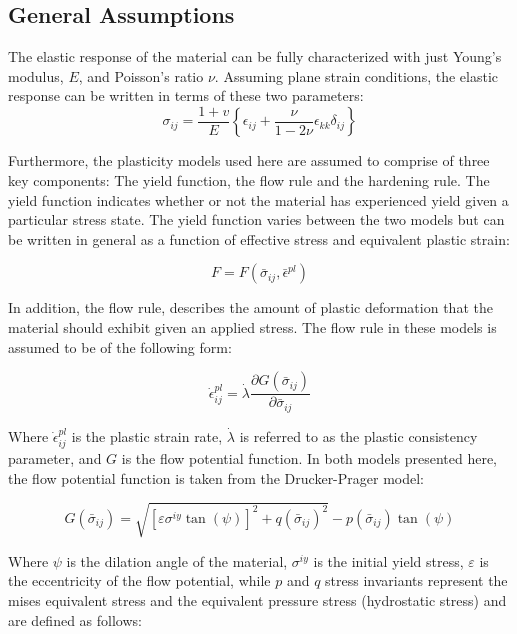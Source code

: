 \subsection{General Assumptions}
The elastic response of the material can be fully characterized with just Young's modulus, $E$, and Poisson's ratio $\nu$. Assuming plane strain conditions, the elastic response can be written in terms of these two parameters:
\begin{equation}
\sigma_{ij}=\frac{1+v}{E}\left\{\epsilon_{ij}+\frac{\nu}{1-2\nu}\epsilon_{kk}\delta_{ij}\right\}
\label{eqn:const8a}
\end{equation}

Furthermore, the plasticity models used here are assumed to comprise of three key components: The yield function, the flow rule and the hardening rule. The yield function indicates whether or not the material has experienced yield given a particular stress state. The yield function varies between the two models but can be written in general as a function of effective stress and equivalent plastic strain:

\begin{equation}
    F = 
    F
    \left(
        \bar{\sigma}_{ij},\bar{\epsilon}^{pl}
    \right)
\label{eqn:const8c}
\end{equation}

In addition, the flow rule, describes the amount of plastic deformation that the material should exhibit given an applied stress. The flow rule in these models is assumed to be of the following form:

\begin{equation}
\dot{\epsilon}^{pl}_{ij}=\dot{\lambda} \frac{\partial G\left(\bar{\sigma}_{ij}\right)}{\partial \bar{\sigma}_{ij}}
\label{eqn:const8b}
\end{equation}

Where $\dot{\epsilon}^{pl}_{ij}$ is the plastic strain rate, $\dot{\lambda}$ is referred to as the plastic consistency parameter, and $G$ is the flow potential function. In both models presented here, the flow potential function is taken from the Drucker-Prager model:

\begin{equation}
G\left(\bar{\sigma}_{ij}\right)=\sqrt{\left[\varepsilon\sigma^{iy}\tan\left(\psi\right)\right]^{2}+q\left(\bar{\sigma}_{ij}\right)^{2}}-p\left(\bar{\sigma}_{ij}\right)\tan\left(\psi\right)\label{eqn:const11}
\end{equation}

Where $\psi$ is the dilation angle of the material, $\sigma^{iy}$ is the initial yield stress, $\varepsilon$ is the eccentricity of the flow potential, while $p$ and $q$ stress invariants represent the mises equivalent stress and the equivalent pressure stress (hydrostatic stress) and are defined as follows:

